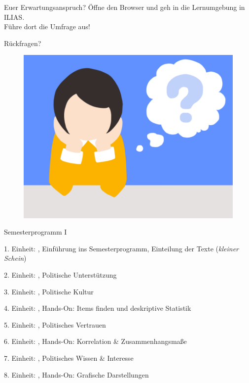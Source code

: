 \documentclass[11pt]{beamer}
\begin{document}
\begin{frame}[t]{Euer Erwartungsanspruch?}
Öffne den Browser und geh in die Lernumgebung in ILIAS. \\

Führe dort die Umfrage aus!
\end{frame}

\begin{frame}[t]{Rückfragen?}
	\begin{center}
		\begin{figure}[ht]
			\includegraphics[width=\textwidth]{pics/pre8.png}
		\end{figure}	
	\end{center}
\end{frame}

\begin{frame}[t]{Semesterprogramm I}
\begin{nolist}
		\item[1.] Einheit: , Einführung ins Semesterprogramm, Einteilung der Texte (\textit{kleiner Schein})
		\item[2.] Einheit: , Politische Unterstützung \pause
		\item[3.] Einheit: , Politische Kultur
		\item[4.] Einheit: , Hands-On: Items finden und deskriptive Statistik \pause
		\item[5.] Einheit: , Politisches Vertrauen
		\item[6.] Einheit: , Hands-On: Korrelation \& Zusammenhangsmaße \pause
		\item[7.] Einheit: , Politisches Wissen \& Interesse
		\item[8.] Einheit: , Hands-On: Grafische Darstellungen \pause
\end{nolist}
\end{frame}
\end{document}
